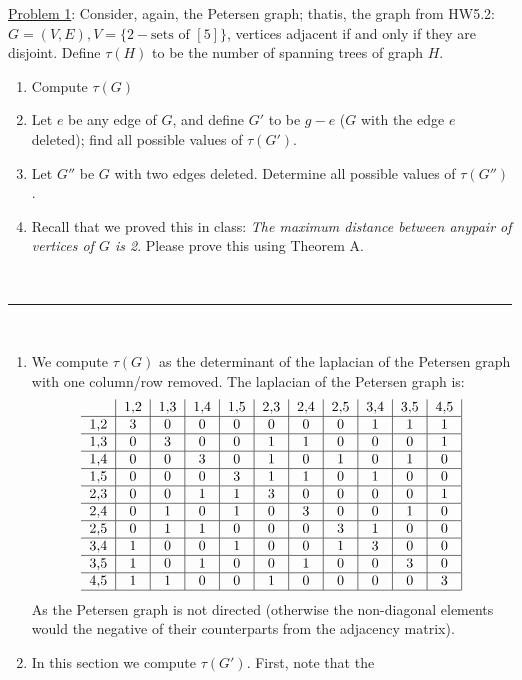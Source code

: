\documentclass{article}
\newcommand{\statementsep}{\leavevmode\\[0.005in] \rule[\baselineskip/4]{\textwidth}{0.4pt}\leavevmode\\[0.005in]}
\begin{document}
\noindent\underline{Problem 1}: Consider, again, the Petersen graph; thatis, the graph from HW5.2: $G = (V,E), V=\{2-\text{sets of } [5]\}$, vertices adjacent if and only if they are disjoint. Define $\tau(H)$ to be the number of spanning trees of graph $H$. 
\begin{enumerate}
	\item Compute $\tau(G)$
	\item Let $e$ be any edge of $G$, and define $G'$ to be $g - e$  ($G$ with the edge $e$ deleted); find all possible values of $\tau(G')$.
	\item Let $G''$ be $G$ with two edges deleted. Determine all possible values of $\tau(G'')$.
	\item Recall that we proved this in class: {\it The maximum distance between anypair of vertices of $G$ is 2}. Please prove this using Theorem A.
\end{enumerate}
\statementsep
\begin{enumerate}
	\item We compute $\tau(G)$ as the determinant of the laplacian of the Petersen graph with one column/row removed. The laplacian of the Petersen graph is:
		\begin{equation*}
			\begin{tabular}{c | c | c | c | c |c | c | c | c | c | c |}
				   & 1,2 & 1,3 & 1,4 & 1,5 & 2,3 & 2,4 & 2,5 & 3,4 & 3,5 & 4,5 \\ \hline 
				1,2& 3   & 0   & 0   & 0   & 0   & 0   & 0   & 1   & 1   & 1   \\ \hline
				1,3& 0   & 3   & 0   & 0   & 1   & 1   & 0   & 0   & 0   & 1   \\ \hline
				1,4& 0   & 0   & 3   & 0   & 1   & 0   & 1   & 0   & 1   & 0   \\ \hline
				1,5& 0   & 0   & 0   & 3   & 1   & 1   & 0   & 1   & 0   & 0   \\ \hline
				2,3& 0   & 0   & 1   & 1   & 3   & 0   & 0   & 0   & 0   & 1   \\ \hline
				2,4& 0   & 1   & 0   & 1   & 0   & 3   & 0   & 0   & 1   & 0   \\ \hline
				2,5& 0   & 1   & 1   & 0   & 0   & 0   & 3   & 1   & 0   & 0   \\ \hline
				3,4& 1   & 0   & 0   & 1   & 0   & 0   & 1   & 3   & 0   & 0   \\ \hline
				3,5& 1   & 0   & 1   & 0   & 0   & 1   & 0   & 0   & 3   & 0   \\ \hline
				4,5& 1   & 1   & 0   & 0   & 1   & 0   & 0   & 0   & 0   & 3   \\ \hline
			\end{tabular}
		\end{equation*}
		As the Petersen graph is not directed (otherwise the non-diagonal elements would the negative of their counterparts from the adjacency matrix).
	\item In this section we compute $\tau(G')$. First, note that the 
\end{enumerate}
\end{document}
